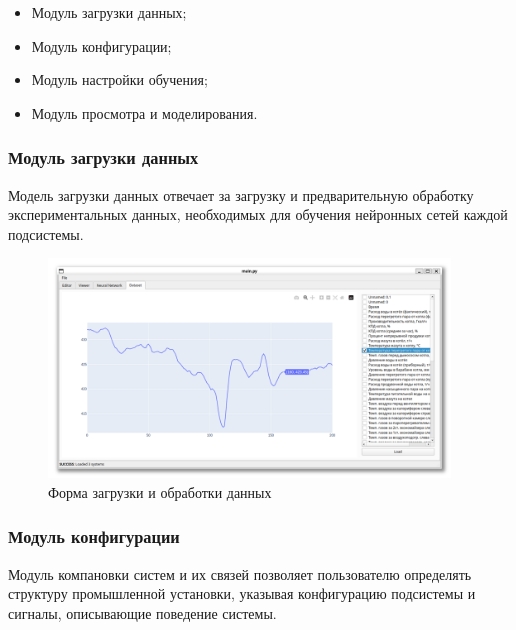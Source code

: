 \begin{itemize}
  \item Модуль загрузки данных;
  \item Модуль конфигурации;
  \item Модуль настройки обучения;
  \item Модуль просмотра и моделирования.
\end{itemize}

\subsubsection{Модуль загрузки данных}

Модель загрузки данных отвечает за загрузку и предварительную обработку
экспериментальных данных, необходимых для обучения нейронных сетей каждой
подсистемы. 

\begin{figure}[H]
  \begin{center}
    \includegraphics[width=0.95\textwidth]{figures/modules/loader.png}
  \end{center}
  \caption{Форма загрузки и обработки данных}\label{fig:forms:loader}
\end{figure}

\subsubsection{Модуль конфигурации}

Модуль компановки систем и их связей позволяет пользователю определять
структуру промышленной установки, указывая конфигурацию подсистемы и сигналы,
описывающие поведение системы. 

